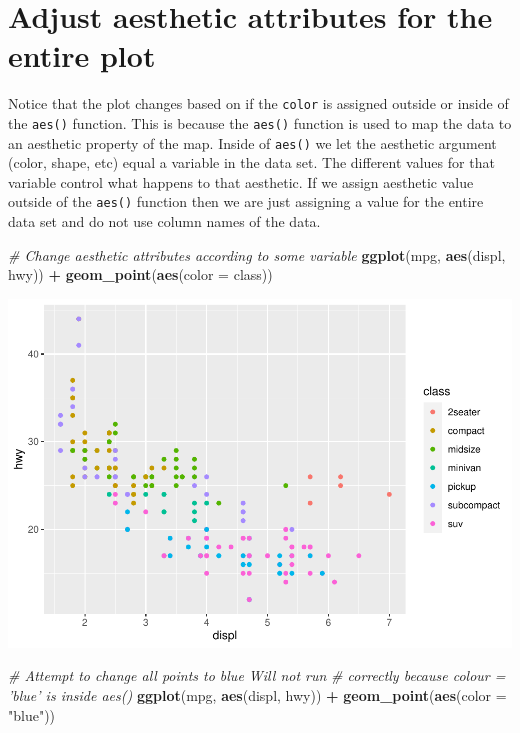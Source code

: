 \documentclass[
]{book}
\newenvironment{Shaded}{\begin{snugshade}}{\end{snugshade}}
\newcommand{\CommentTok}[1]{\textcolor[rgb]{0.56,0.35,0.01}{\textit{#1}}}
\newcommand{\DataTypeTok}[1]{\textcolor[rgb]{0.13,0.29,0.53}{#1}}
\newcommand{\KeywordTok}[1]{\textcolor[rgb]{0.13,0.29,0.53}{\textbf{#1}}}
\newcommand{\NormalTok}[1]{#1}
\newcommand{\OperatorTok}[1]{\textcolor[rgb]{0.81,0.36,0.00}{\textbf{#1}}}
\newcommand{\StringTok}[1]{\textcolor[rgb]{0.31,0.60,0.02}{#1}}
\begin{document}
\hypertarget{adjust-aesthetic-attributes-for-the-entire-plot}{%
\section{Adjust aesthetic attributes for the entire plot}\label{adjust-aesthetic-attributes-for-the-entire-plot}}

Notice that the plot changes based on if the \texttt{color} is assigned outside or inside of the \texttt{aes()} function. This is because the \texttt{aes()} function is used to map the data to an aesthetic property of the map. Inside of \texttt{aes()} we let the aesthetic argument (color, shape, etc) equal a variable in the data set. The different values for that variable control what happens to that aesthetic. If we assign aesthetic value outside of the \texttt{aes()} function then we are just assigning a value for the entire data set and do not use column names of the data.

\begin{Shaded}
\begin{Highlighting}[]
\CommentTok{# Change aesthetic attributes according to some variable}
\KeywordTok{ggplot}\NormalTok{(mpg, }\KeywordTok{aes}\NormalTok{(displ, hwy)) }\OperatorTok{+}\StringTok{ }\KeywordTok{geom_point}\NormalTok{(}\KeywordTok{aes}\NormalTok{(}\DataTypeTok{color =}\NormalTok{ class))}
\end{Highlighting}
\end{Shaded}

\includegraphics{_main_files/figure-latex/unnamed-chunk-317-1.pdf}

\begin{Shaded}
\begin{Highlighting}[]
\CommentTok{# Attempt to change all points to blue Will not run}
\CommentTok{# correctly because colour = 'blue' is inside aes()}
\KeywordTok{ggplot}\NormalTok{(mpg, }\KeywordTok{aes}\NormalTok{(displ, hwy)) }\OperatorTok{+}\StringTok{ }\KeywordTok{geom_point}\NormalTok{(}\KeywordTok{aes}\NormalTok{(}\DataTypeTok{color =} \StringTok{"blue"}\NormalTok{))}
\end{Highlighting}
\end{Shaded}
\end{document}
